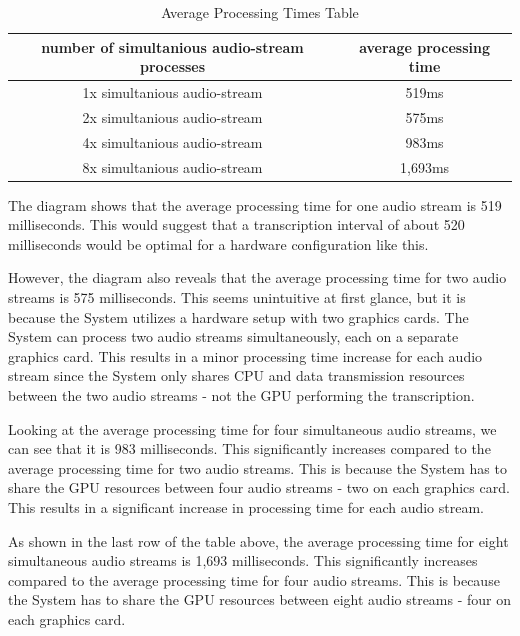 \begin{table}[ht]
	\begin{center}
		\begin{tabular}{ |c|c| } 
			\hline
			number of simultanious audio-stream processes & average processing time \\
			\hline\hline
			1x simultanious audio-stream & 519ms \\
			\hline
			2x simultanious audio-stream & 575ms \\
			\hline
			4x simultanious audio-stream & 983ms \\
			\hline
			8x simultanious audio-stream & 1,693ms \\
			\hline
		\end{tabular}
	\end{center}
	\caption{Average Processing Times Table}
	\label{tab:avgProcessingTimesTable}
\end{table}

\pagebreak

The diagram shows that the average processing time for one audio stream is 519 milliseconds. This would suggest that a 
transcription interval of about 520 milliseconds would be optimal for a hardware configuration like this. 

However, the diagram also reveals that the average processing time for two audio streams is 575 milliseconds. This 
seems unintuitive at first glance, but it is because the System utilizes a hardware setup with two graphics cards. 
The System can process two audio streams simultaneously, each on a separate graphics card. This results in a minor 
processing time increase for each audio stream since the System only shares CPU and data transmission resources between 
the two audio streams - not the GPU performing the transcription.

Looking at the average processing time for four simultaneous audio streams, we can see that it is 983 milliseconds. 
This significantly increases compared to the average processing time for two audio streams. This is because the System 
has to share the GPU resources between four audio streams - two on each graphics card. This results in a significant 
increase in processing time for each audio stream.

As shown in the last row of the table above, the average processing time for eight simultaneous audio streams is 
1,693 milliseconds. This significantly increases compared to the average processing time for four audio streams. 
This is because the System has to share the GPU resources between eight audio streams - four on each graphics card. 

